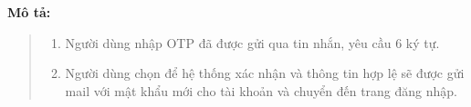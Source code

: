     \textbf{Mô tả:}
    \begin{quote}
        \begin{enumerate}
            \item Người dùng nhập OTP đã được gửi qua tin nhắn, yêu cầu 6 ký tự.
            \item Người dùng chọn để hệ thống xác nhận và thông tin hợp lệ sẽ được gửi mail với mật khẩu mới cho tài khoản và chuyển đến trang đăng nhập.
        \end{enumerate}
    \end{quote}
   
